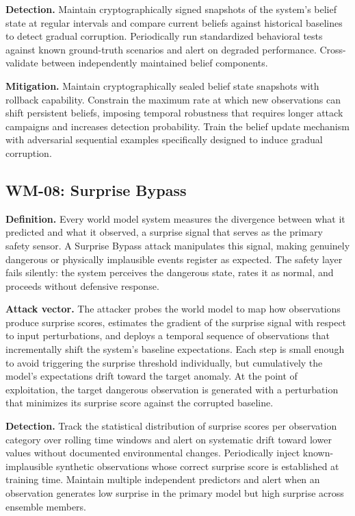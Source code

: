 \documentclass[11pt,a4paper]{article}
\begin{document}
\textbf{Detection.} Maintain cryptographically signed snapshots of the system's belief state at regular intervals and compare current beliefs against historical baselines to detect gradual corruption. Periodically run standardized behavioral tests against known ground-truth scenarios and alert on degraded performance. Cross-validate between independently maintained belief components.

\textbf{Mitigation.} Maintain cryptographically sealed belief state snapshots with rollback capability. Constrain the maximum rate at which new observations can shift persistent beliefs, imposing temporal robustness that requires longer attack campaigns and increases detection probability. Train the belief update mechanism with adversarial sequential examples specifically designed to induce gradual corruption.

\subsection{WM-08: Surprise Bypass}

\textbf{Definition.} Every world model system measures the divergence between what it predicted and what it observed, a surprise signal that serves as the primary safety sensor. A Surprise Bypass attack manipulates this signal, making genuinely dangerous or physically implausible events register as expected. The safety layer fails silently: the system perceives the dangerous state, rates it as normal, and proceeds without defensive response.

\textbf{Attack vector.} The attacker probes the world model to map how observations produce surprise scores, estimates the gradient of the surprise signal with respect to input perturbations, and deploys a temporal sequence of observations that incrementally shift the system's baseline expectations. Each step is small enough to avoid triggering the surprise threshold individually, but cumulatively the model's expectations drift toward the target anomaly. At the point of exploitation, the target dangerous observation is generated with a perturbation that minimizes its surprise score against the corrupted baseline.

\textbf{Detection.} Track the statistical distribution of surprise scores per observation category over rolling time windows and alert on systematic drift toward lower values without documented environmental changes. Periodically inject known-implausible synthetic observations whose correct surprise score is established at training time. Maintain multiple independent predictors and alert when an observation generates low surprise in the primary model but high surprise across ensemble members.
\end{document}
